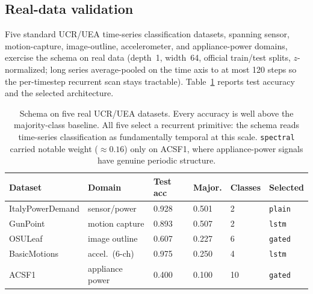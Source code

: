 \documentclass[11pt]{article}
\newcommand{\allowbreakhere}{\discretionary{}{}{}}
\newcommand{\code}[1]{\texttt{\def\_{\char`_\allowbreakhere}#1}}
\begin{document}
\subsection{Real-data validation}
\label{sec:realdata}

Five standard UCR/UEA time-series classification datasets, spanning sensor, motion-capture,
image-outline, accelerometer, and appliance-power domains, exercise the schema on
real data (depth~1, width~64, official train/test splits, $z$-normalized; long series
average-pooled on the time axis to at most 120 steps so the per-timestep recurrent scan stays
tractable). Table~\ref{tab:realdata} reports test accuracy and the selected architecture.

\begin{table}[h]
\centering
\small
\renewcommand{\arraystretch}{1.2}
\begin{tabular}{p{3.4cm} p{2.4cm} p{1.4cm} p{1.4cm} p{1.4cm} p{2.0cm}}
\toprule
\textbf{Dataset} & \textbf{Domain} & \textbf{Test acc} & \textbf{Major.} & \textbf{Classes} & \textbf{Selected}\\
\midrule
ItalyPowerDemand & sensor/power    & 0.928 & 0.501 & 2  & \code{plain}\\
GunPoint         & motion capture  & 0.893 & 0.507 & 2  & \code{lstm}\\
OSULeaf          & image outline   & 0.607 & 0.227 & 6  & \code{gated}\\
BasicMotions     & accel.\ (6-ch)  & 0.975 & 0.250 & 4  & \code{lstm}\\
ACSF1            & appliance power & 0.400 & 0.100 & 10 & \code{gated}\\
\bottomrule
\end{tabular}
\caption{Schema on five real UCR/UEA datasets. Every accuracy is well above the
majority-class baseline. All five select a recurrent primitive: the schema reads
time-series classification as fundamentally temporal at this scale. \code{spectral} carried
notable weight ($\approx0.16$) only on ACSF1, where appliance-power signals have genuine
periodic structure.}
\label{tab:realdata}
\end{table}
\end{document}
